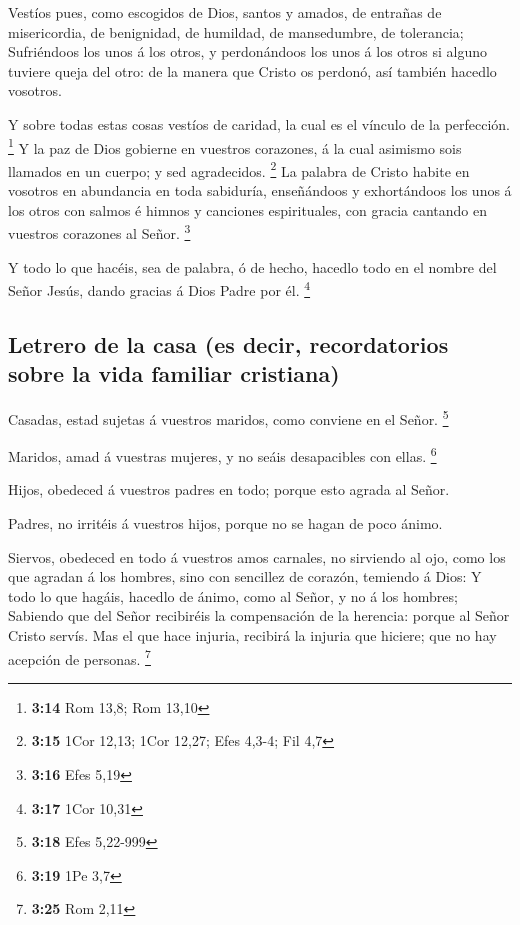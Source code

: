  Vestíos pues, como escogidos de Dios, santos y amados,
de entrañas de misericordia, de benignidad, de humildad, de mansedumbre,
de tolerancia;  Sufriéndoos los unos á los otros, y
perdonándoos los unos á los otros si alguno tuviere queja del otro: de
la manera que Cristo os perdonó, así también hacedlo vosotros.

 Y sobre todas estas cosas vestíos de caridad, la cual es
el vínculo de la perfección. \footnote{\textbf{3:14} Rom 13,8; Rom 13,10}
 Y la paz de Dios gobierne en vuestros corazones, á la
cual asimismo sois llamados en un cuerpo; y sed agradecidos. \footnote{\textbf{3:15}
  1Cor 12,13; 1Cor 12,27; Efes 4,3-4; Fil 4,7}  La
palabra de Cristo habite en vosotros en abundancia en toda sabiduría,
enseñándoos y exhortándoos los unos á los otros con salmos é himnos y
canciones espirituales, con gracia cantando en vuestros corazones al
Señor. \footnote{\textbf{3:16} Efes 5,19}

 Y todo lo que hacéis, sea de palabra, ó de hecho,
hacedlo todo en el nombre del Señor Jesús, dando gracias á Dios Padre
por él. \footnote{\textbf{3:17} 1Cor 10,31}

\hypertarget{letrero-de-la-casa-es-decir-recordatorios-sobre-la-vida-familiar-cristiana}{%
\subsection{Letrero de la casa (es decir, recordatorios sobre la vida
familiar
cristiana)}\label{letrero-de-la-casa-es-decir-recordatorios-sobre-la-vida-familiar-cristiana}}

 Casadas, estad sujetas á vuestros maridos, como conviene
en el Señor. \footnote{\textbf{3:18} Efes 5,22-999}

 Maridos, amad á vuestras mujeres, y no seáis
desapacibles con ellas. \footnote{\textbf{3:19} 1Pe 3,7}

 Hijos, obedeced á vuestros padres en todo; porque esto
agrada al Señor.

 Padres, no irritéis á vuestros hijos, porque no se hagan
de poco ánimo.

 Siervos, obedeced en todo á vuestros amos carnales, no
sirviendo al ojo, como los que agradan á los hombres, sino con sencillez
de corazón, temiendo á Dios:  Y todo lo que hagáis,
hacedlo de ánimo, como al Señor, y no á los hombres; 
Sabiendo que del Señor recibiréis la compensación de la herencia: porque
al Señor Cristo servís.  Mas el que hace injuria,
recibirá la injuria que hiciere; que no hay acepción de personas.
\footnote{\textbf{3:25} Rom 2,11}


